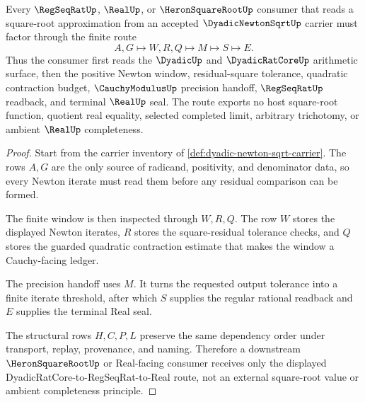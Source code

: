 \begin{theorem}
\label{thm:dyadic-newton-sqrt-quadratic-window-route}
Every $\RegSeqRatUp$, $\RealUp$, or $\HeronSquareRootUp$ consumer that reads a square-root approximation from an accepted $\DyadicNewtonSqrtUp$ carrier must factor through the finite route
$$
A,G \longmapsto W,R,Q \longmapsto M \longmapsto S \longmapsto E .
$$
Thus the consumer first reads the $\DyadicUp$ and $\DyadicRatCoreUp$ arithmetic surface, then the positive Newton window, residual-square tolerance, quadratic contraction budget, $\CauchyModulusUp$ precision handoff, $\RegSeqRatUp$ readback, and terminal $\RealUp$ seal. The route exports no host square-root function, quotient real equality, selected completed limit, arbitrary trichotomy, or ambient $\RealUp$ completeness.
\end{theorem}
\begin{proof}
Start from the carrier inventory of \autoref{def:dyadic-newton-sqrt-carrier}. The rows $A,G$ are the only source of radicand, positivity, and denominator data, so every Newton iterate must read them before any residual comparison can be formed.

The finite window is then inspected through $W,R,Q$. The row $W$ stores the displayed Newton iterates, $R$ stores the square-residual tolerance checks, and $Q$ stores the guarded quadratic contraction estimate that makes the window a Cauchy-facing ledger.

The precision handoff uses $M$. It turns the requested output tolerance into a finite iterate threshold, after which $S$ supplies the regular rational readback and $E$ supplies the terminal Real seal.

The structural rows $H,C,P,L$ preserve the same dependency order under transport, replay, provenance, and naming. Therefore a downstream $\HeronSquareRootUp$ or Real-facing consumer receives only the displayed DyadicRatCore-to-RegSeqRat-to-Real route, not an external square-root value or ambient completeness principle.
\end{proof}


